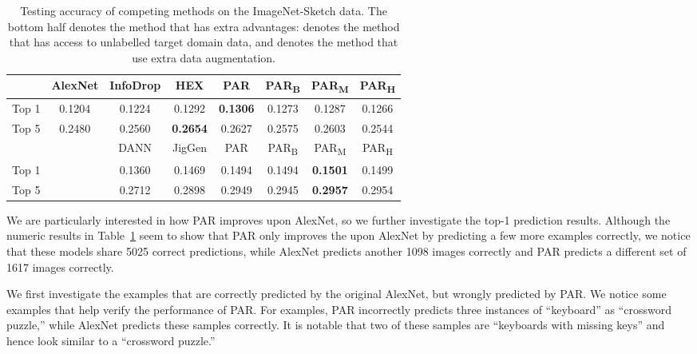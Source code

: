 \documentclass{article}
\begin{document}
\begin{table}[]
\caption{Testing accuracy of competing methods on the ImageNet-Sketch data. 
The bottom half denotes the method that has extra advantages: 
 denotes the method that has access to unlabelled target domain data, 
and  denotes the method that use extra data augmentation. 
\break \tiny}
\label{tab:sketch}
\centering
\begin{tabular}{cccccccc}
\hline
 & AlexNet & InfoDrop & HEX & PAR & PAR\textsubscript{B} & PAR\textsubscript{M} & PAR\textsubscript{H} \\ \hline
Top 1 & 0.1204 & 0.1224 & 0.1292 & \textbf{0.1306} & 0.1273 & 0.1287 & 0.1266 \\
Top 5 & 0.2480 & 0.2560 & \textbf{0.2654} & 0.2627 & 0.2575 & 0.2603 & 0.2544 \\ \hline
 &  & DANN & JigGen & PAR & PAR\textsubscript{B} & PAR\textsubscript{M} & PAR\textsubscript{H} \\ \hline
Top 1 &  & 0.1360 & 0.1469 & 0.1494 & 0.1494 & \textbf{0.1501} & 0.1499 \\
Top 5 &  & 0.2712 & 0.2898 & 0.2949 & 0.2945 & \textbf{0.2957} & 0.2954 \\ \hline
\end{tabular}
\end{table}

We are particularly interested in how PAR improves upon AlexNet, so we further investigate the top-1 prediction results. 
Although the numeric results in Table~\ref{tab:sketch} seem to show that PAR only improves the upon AlexNet by predicting a few more examples correctly, we notice that these models share 5025 correct predictions, while AlexNet predicts another 1098 images correctly and PAR predicts a different set of 1617 images correctly. 



We first investigate the examples that are correctly predicted by the original AlexNet, but wrongly predicted by PAR. 
We notice some examples that help verify the performance of PAR. 
For examples, PAR incorrectly predicts three instances of ``keyboard'' as ``crossword puzzle,'' while AlexNet predicts these samples correctly.  
It is notable that two of these samples are ``keyboards with missing keys'' and hence look similar to a ``crossword puzzle.'' 
\end{document}
